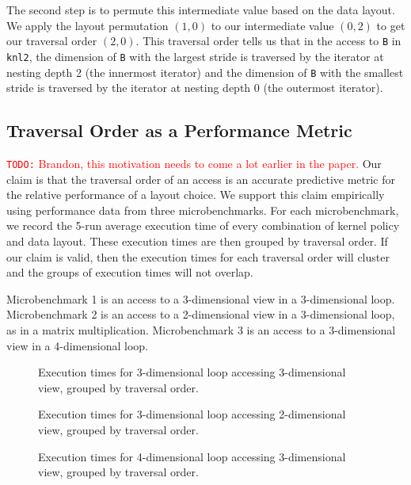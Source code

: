 \documentclass[sigconf, table]{acmart}
\newcommand{\todo}[1]{{\textcolor{red}{{\tt{TODO:}}\,\,#1 }}}
\begin{document}
The second step is to permute this intermediate value based on the data layout. 
We apply the layout permutation $(1,0)$ to our intermediate value $(0,2)$ to get our traversal order $(2,0)$. 
This traversal order tells us that in the access to \verb.B. in \verb.knl2., the dimension of \verb.B. with the largest stride is traversed by the iterator at nesting depth 2 (the innermost iterator) and the dimension of \verb.B. with the smallest stride is traversed by the iterator at nesting depth 0 (the outermost iterator). 

\subsection{Traversal Order as a Performance Metric}

\todo{Brandon, this motivation needs to come a lot earlier in the paper.}
Our claim is that the traversal order of an access is an accurate predictive metric for the relative performance of a layout choice. 
We support this claim empirically using performance data from three microbenchmarks.
For each microbenchmark, we record the 5-run average execution time of every combination of kernel policy and data layout. 
These execution times are then grouped by traversal order.
If our claim is valid, then the execution times for each traversal order will cluster and the groups of execution times will not overlap.

Microbenchmark 1 is an access to a 3-dimensional view in a 3-dimensional loop. 
Microbenchmark 2 is an access to a 2-dimensional view in a 3-dimensional loop, as in a matrix multiplication.
Microbenchmark 3 is an access to a 3-dimensional view in a 4-dimensional loop.


\begin{figure}
\caption{Execution times for 3-dimensional loop accessing 3-dimensional view, grouped by traversal order.}
\label{TraversalBenchmark1}
\end{figure}

\begin{figure}
	\caption{Execution times for 3-dimensional loop accessing 2-dimensional view, grouped by traversal order.}
	\label{TraversalBenchmark2}
\end{figure}

\begin{figure}
	\caption{Execution times for 4-dimensional loop accessing 3-dimensional view, grouped by traversal order.}
	\label{TraversalBenchmark3}
\end{figure}
\end{document}

